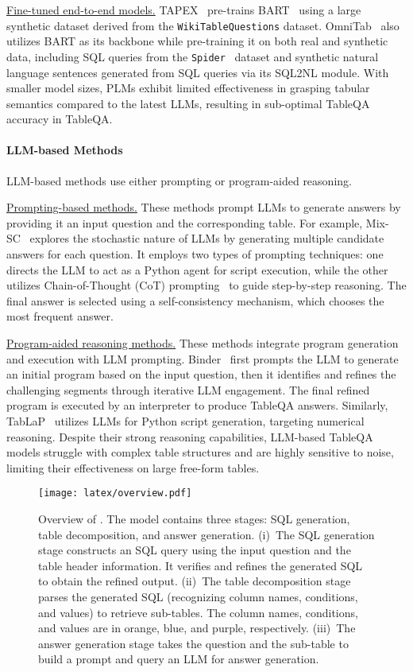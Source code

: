 \underline{Fine-tuned end-to-end models.} TAPEX~\cite{liu2022tapex} pre-trains BART~\cite{lewis-etal-2020-bart} using a large synthetic dataset derived from the \texttt{WikiTableQuestions} dataset. 
OmniTab~\cite{jiang-etal-2022-omnitab} also utilizes BART as its backbone  
while pre-training it on both real and synthetic data, 
including SQL queries from the \texttt{Spider}~\cite{yu-etal-2018-spider} dataset and synthetic natural language sentences generated from SQL queries via its SQL2NL module. 
With smaller model sizes, PLMs exhibit limited effectiveness in grasping tabular semantics compared to the latest LLMs, resulting in sub-optimal TableQA accuracy in TableQA.


\paragraph{LLM-based Methods} LLM-based methods use either prompting or program-aided reasoning.

\underline{Prompting-based methods.} These methods prompt LLMs to generate answers by providing it an input question and the corresponding table. For example, Mix-SC~\cite{liu-etal-2024-rethinking} explores the stochastic nature of LLMs by generating multiple candidate answers for each question. It employs two types of prompting techniques: one directs the LLM to act as a Python agent for script execution, while the other utilizes Chain-of-Thought (CoT) prompting~\cite{wei2022chain} to guide step-by-step reasoning. The final answer is selected using a self-consistency mechanism, which chooses the most frequent answer. 

\underline{Program-aided reasoning methods.} These methods  integrate program generation and execution with LLM prompting.  Binder~\cite{cheng2023binding} first prompts the LLM to generate an initial program based on the input question, then it identifies and refines the challenging segments through iterative LLM engagement. The final refined program is executed by an interpreter to produce TableQA answers. Similarly, TabLaP~\cite{abs-2410-12846} utilizes LLMs for Python script generation, targeting numerical reasoning.  Despite their strong reasoning capabilities, LLM-based TableQA models struggle with complex table structures and are highly sensitive to noise, limiting their effectiveness on large free-form tables.

\begin{figure*}[t]
     \centering
     \texttt{[image: latex/overview.pdf]}
     \caption{Overview of \model. The model contains three stages: SQL generation, table decomposition, and answer generation. (i)~The SQL generation stage constructs an SQL query using the input question and the table header information. It verifies and refines the generated SQL to obtain the refined output. (ii)~The table decomposition stage parses the generated SQL (recognizing column names, conditions, and values) to retrieve sub-tables. The column names, conditions, and values are in orange, blue, and purple, respectively. (iii)~The answer generation stage takes the question and the sub-table to build a  prompt and query an LLM for answer generation.}
     \label{fig:model_overview}
\end{figure*}


